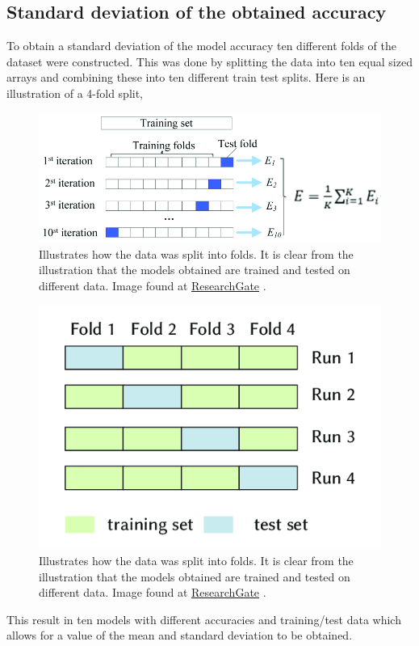 \documentclass[11pt, fleqn, titlepage]{article}
\begin{document}
	\subsection{Standard deviation of the obtained accuracy} \label{standard_deviation}
	To obtain a standard deviation of the model accuracy ten different folds of the dataset were constructed. This was done by splitting the data into ten equal sized arrays and combining these into ten different train test splits. Here is an illustration of a 4-fold split, 
	
	\begin{figure}[H]
		\centering
		\includegraphics[width=0.8\linewidth]{imgs/kfolds2}
		\caption{Illustrates how the data was split into folds. It is clear from the illustration that the models obtained are trained and tested on different data. Image found at \href{https://www.researchgate.net/figure/The-technique-of-KFold-cross-validation-illustrated-here-for-the-case-K-4-involves_fig10_278826818}{ResearchGate} \cite{researchgate}. }
		\label{fig:kfolds}
	\end{figure}
	
	\begin{figure}[H]
		\centering
		\includegraphics[width=0.4\linewidth]{imgs/kfolds}
		\caption{Illustrates how the data was split into folds. It is clear from the illustration that the models obtained are trained and tested on different data. Image found at \href{https://www.researchgate.net/figure/The-technique-of-KFold-cross-validation-illustrated-here-for-the-case-K-4-involves_fig10_278826818}{ResearchGate} \cite{researchgate}. }
		\label{fig:kfolds}
	\end{figure}
	\noindent
	This result in ten models with different accuracies and training/test data which allows for a value of the mean and standard deviation to be obtained.
	
\end{document}
